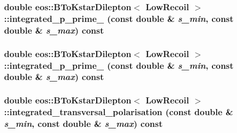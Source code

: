 \label{classeos_1_1BToKstarDilepton_3_01LowRecoil_01_4_a968b483ff53e3a67d8b0887d8f894467}
\hypertarget{classeos_1_1BToKstarDilepton_3_01LowRecoil_01_4_a00fccd39baa4ef40ce1df88e790479c2}{
\subsubsection[{integrated\_\-p\_\-prime\_\-5}]{\setlength{\rightskip}{0pt plus 5cm}double eos::BToKstarDilepton$<$ {\bf LowRecoil} $>$::integrated\_\-p\_\-prime\_ (const double \& {\em s\_\-min}, \/  const double \& {\em s\_\-max}) const}}
\label{classeos_1_1BToKstarDilepton_3_01LowRecoil_01_4_a00fccd39baa4ef40ce1df88e790479c2}
\hypertarget{classeos_1_1BToKstarDilepton_3_01LowRecoil_01_4_adf3ffad49e2311d7d112d7af53948002}{
\subsubsection[{integrated\_\-p\_\-prime\_\-6}]{\setlength{\rightskip}{0pt plus 5cm}double eos::BToKstarDilepton$<$ {\bf LowRecoil} $>$::integrated\_\-p\_\-prime\_ (const double \& {\em s\_\-min}, \/  const double \& {\em s\_\-max}) const}}
\label{classeos_1_1BToKstarDilepton_3_01LowRecoil_01_4_adf3ffad49e2311d7d112d7af53948002}
\hypertarget{classeos_1_1BToKstarDilepton_3_01LowRecoil_01_4_af15faa28564c5a6a6c0e5905255fb8e7}{
\subsubsection[{integrated\_\-transversal\_\-polarisation}]{\setlength{\rightskip}{0pt plus 5cm}double eos::BToKstarDilepton$<$ {\bf LowRecoil} $>$::integrated\_\-transversal\_\-polarisation (const double \& {\em s\_\-min}, \/  const double \& {\em s\_\-max}) const}}
